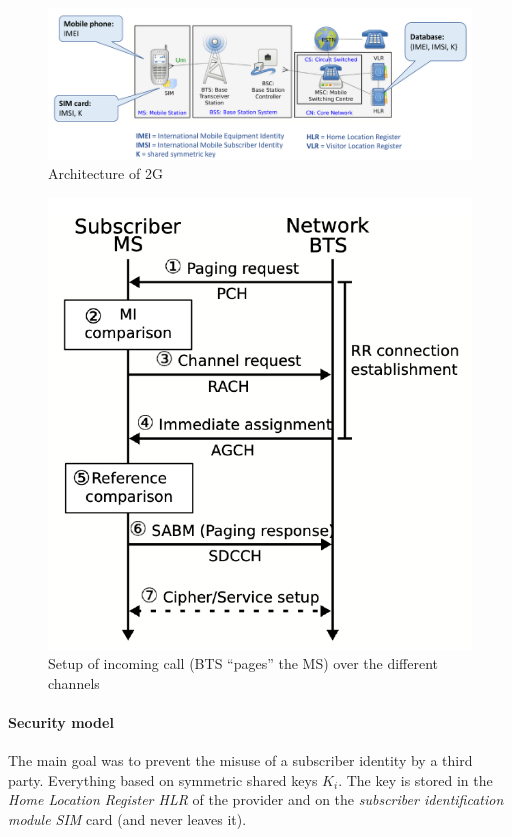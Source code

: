 \begin{figure}[h]
	\centering
	\includegraphics[scale=0.45]{images/10-2g-arch.png}
	\caption{Architecture of 2G}%
	\label{fig:2g-arch}
\end{figure}

\begin{figure}[h]
	\centering
	\includegraphics[scale=0.4]{images/10-2g-channels.png}
	\caption{Setup of incoming call (BTS ``pages'' the MS) over the different channels}%
	\label{fig:2g-channels}
\end{figure}

\paragraph{Security model}
The main goal was to prevent the misuse of a subscriber identity by a third
party. Everything based on symmetric shared keys $K_i$. The key is stored in
the \textit{Home Location Register HLR} of the provider and on the
\textit{subscriber identification module SIM} card (and never leaves it).

